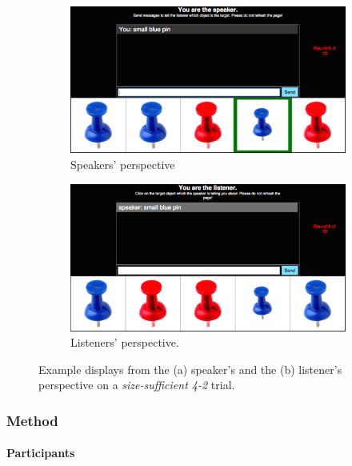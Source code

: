 \documentclass[11pt]{article}
\begin{document}
\begin{figure}
\begin{subfigure}{\textwidth}
\includegraphics[width=\textwidth]{pics/speaker-perspective-small.png}
\caption{Speakers' perspective}
\label{fig:speakerpersp}
\end{subfigure}

\begin{subfigure}{\textwidth}
\includegraphics[width=\textwidth]{pics/listener-perspective-small.png}
\caption{Listeners' perspective.}
\label{fig:listenerpersp}
\end{subfigure}
\caption{Example displays from the  (a) speaker's and the  (b)  listener's perspective on a \emph{size-sufficient 4-2} trial.}
\label{fig:speakerlistenerperspective}
\end{figure}

\subsubsection{Method}

\paragraph{Participants}
\end{document}
